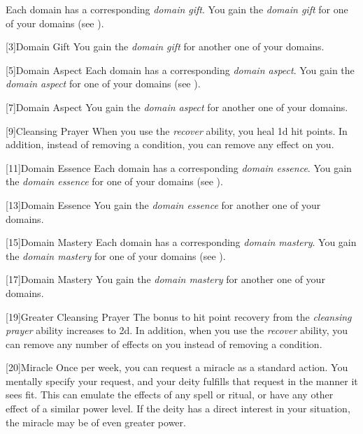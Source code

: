         Each domain has a corresponding \textit{domain gift}.
        You gain the \textit{domain gift} for one of your domains (see ).

        [3]{Domain Gift}
        You gain the \textit{domain gift} for another one of your domains.

        [5]{Domain Aspect}
        Each domain has a corresponding \textit{domain aspect}.
        You gain the \textit{domain aspect} for one of your domains (see ).

        [7]{Domain Aspect} 
        You gain the \textit{domain aspect} for another one of your domains.

        [9]{Cleansing Prayer}
        When you use the \textit{recover} ability, you heal \plus1d hit points.
        In addition, instead of removing a condition, you can remove any  effect on you.

        [11]{Domain Essence}
        Each domain has a corresponding \textit{domain essence}.
        You gain the \textit{domain essence} for one of your domains (see ).

        [13]{Domain Essence} 
        You gain the \textit{domain essence} for another one of your domains.

        [15]{Domain Mastery}
        Each domain has a corresponding \textit{domain mastery}.
        You gain the \textit{domain mastery} for one of your domains (see ).

        [17]{Domain Mastery} 
        You gain the \textit{domain mastery} for another one of your domains.

        [19]{Greater Cleansing Prayer} 
        The bonus to hit point recovery from the \textit{cleansing prayer} ability increases to \plus2d.
        In addition, when you use the \textit{recover} ability, you can remove any number of  effects on you instead of removing a condition.

        [20]{Miracle}
        Once per week, you can request a miracle as a standard action.
        You mentally specify your request, and your deity fulfills that request in the manner it sees fit.
        This can emulate the effects of any spell or ritual, or have any other effect of a similar power level.
        If the deity has a direct interest in your situation, the miracle may be of even greater power.

